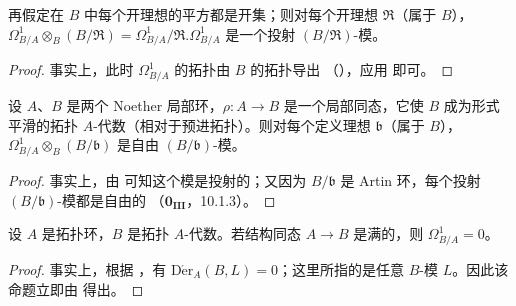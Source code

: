 \begin{corollary}[20.4.10]
\label{0.20.4.10-fr}
再假定在 $B$ 中每个开理想的平方都是开集；则对每个开理想
$\mathfrak{R}$（属于 $B$），
$\Omega^1_{B/A}\otimes_B(B/\mathfrak{R})
=\Omega^1_{B/A}/\mathfrak{R}.\Omega^1_{B/A}$ 是一个投射
$(B/\mathfrak{R})$-模。
\end{corollary}

\begin{proof}
事实上，此时 $\Omega^1_{B/A}$ 的拓扑由 $B$ 的拓扑导出
（），应用  即可。
\end{proof}

\begin{corollary}[20.4.11]
\label{0.20.4.11-fr}
设 $A$、$B$ 是两个 Noether 局部环，$\rho:A\to B$ 是一个局部同态，它使 $B$
成为形式平滑的拓扑 $A$-代数（相对于预进拓扑）。则对每个定义理想
$\mathfrak{b}$（属于 $B$），$\Omega^1_{B/A}\otimes_B(B/\mathfrak{b})$ 是自由
$(B/\mathfrak{b})$-模。
\end{corollary}

\begin{proof}
事实上，由  可知这个模是投射的；又因为 $B/\mathfrak{b}$
是 Artin 环，每个投射 $(B/\mathfrak{b})$-模都是自由的
（$\mathbf{0_{III}}$，10.1.3）。
\end{proof}

\begin{proposition}[20.4.12]
\label{0.20.4.12-fr}
设 $A$ 是拓扑环，$B$ 是拓扑 $A$-代数。若结构同态 $A\to B$ 是满的，则
$\Omega^1_{B/A}=0$。
\end{proposition}

\begin{proof}
事实上，根据 ，有
$\operatorname{D\acute{e}r}_A(B,L)=0$；这里所指的是任意 $B$-模 $L$。因此该命题立即由
 得出。
\end{proof}

